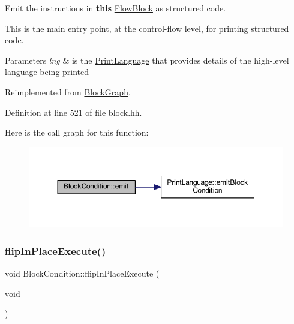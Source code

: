 Emit the instructions in {\bfseries{this}} \mbox{\hyperlink{class_flow_block}{Flow\+Block}} as structured code. 

This is the main entry point, at the control-\/flow level, for printing structured code. 
\begin{DoxyParams}{Parameters}
{\em lng} & is the \mbox{\hyperlink{class_print_language}{Print\+Language}} that provides details of the high-\/level language being printed \\
\hline
\end{DoxyParams}


Reimplemented from \mbox{\hyperlink{class_block_graph_a535d3c7cb13e5e45b6e121b024fa339f}{Block\+Graph}}.



Definition at line 521 of file block.\+hh.

Here is the call graph for this function\+:
\nopagebreak
\begin{figure}[H]
\begin{center}
\leavevmode
\includegraphics[width=350pt]{class_block_condition_a952361756ea8b84dc0234d00d628c164_cgraph}
\end{center}
\end{figure}
\mbox{\label{class_block_condition_a600c60c9af3b7ad9d7b8f58fa0f7ab5a}} 
\subsubsection{\texorpdfstring{flipInPlaceExecute()}{flipInPlaceExecute()}}
{\footnotesize\ttfamily void Block\+Condition\+::flip\+In\+Place\+Execute (\begin{DoxyParamCaption}\item[{void}]{ }\end{DoxyParamCaption})\hspace{0.3cm}{\ttfamily [virtual]}}



